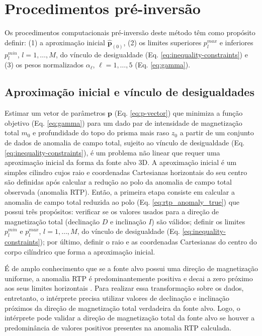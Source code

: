\chapter{Procedimentos pré-inversão}

Os procedimentos computacionais pré-inversão deste método têm como propósito definir: (1) a aproximação inicial $ \hat{\mathbf{p}}_{(0)} $, (2) os limites superiores $ p_l^{max} $ e inferiores $ p_l^{min} $, $ l=1, \dots, M $, do vínculo de desigualdade (Eq. \ref{eq:inequality-constraints}) e (3) os pesos normalizados $ \alpha_{\ell} $, $ \ell=1,\dots,5 $ (Eq. \ref{eq:gamma}). 

\section{Aproximação inicial e vínculo de desigualdades}

Estimar um vetor de parâmetros $\mathbf{p}$ (Eq. \ref{eq:p-vector}) que minimiza a função objetivo (Eq. \ref{eq:gamma}) para um dado par de intensidade de magnetização total $ m_0 $ e profundidade do topo do prisma mais raso $ z_0 $ a partir de um conjunto de dados de anomalia de campo total, sujeito ao vínculo de desigualdade (Eq. \ref{eq:inequality-constraints}), é um problema não linear que requer uma aproximação inicial da forma da fonte alvo 3D. 
A aproximação inicial é um simples cilindro cujos raio e coordenadas Cartesianas horizontais do seu centro são definidas após calcular a redução ao polo da anomalia de campo total observada (anomalia RTP).
Então, a primeira etapa consiste em calcular a anomalia de campo total reduzida ao polo (Eq. \ref{eq:rtp_anomaly_true}) que possui três propósitos: verificar se os valores usados para a direção de magnetização total (declinação $D$ e inclinação $I$) são válidos; definir os limites $p_{l}^{min}$ e $p_{l}^{max}$, $ l=1, \dots, M $, do vínculo de desigualdade (Eq. \ref{eq:inequality-constraints}); por último, definir o raio e as coordenadas Cartesianas do centro do corpo cilíndrico que forma a aproximação inicial.

É de amplo conhecimento que se a fonte alvo possui uma direção de magnetização uniforme, a anomalia RTP é predominantemente positiva e decai a zero próximo aos seus limites horizontais \cite[por exemplo,][p. 331]{blakely1996}.
Para realizar essa transformação sobre os dados, entretanto, o intérprete precisa utilizar valores de declinação e inclinação próximos da direção de magnetização total verdadeira da fonte alvo.
Logo, o intérprete pode validar a direção de magnetização total da fonte alvo se houver a predominância de valores positivos presentes na anomalia RTP calculada.

